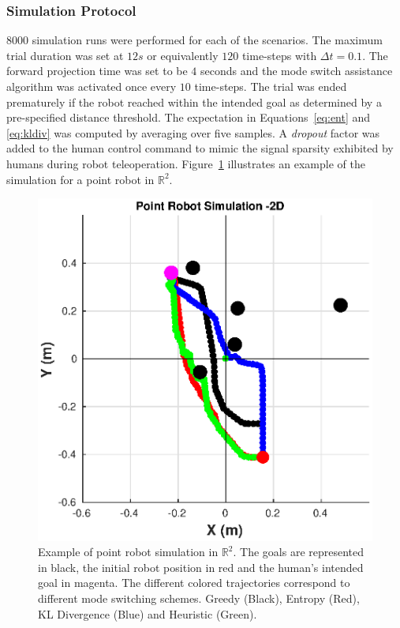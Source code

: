 \documentclass[letterpaper, 10 pt, conference]{ieeeconf}  %
\begin{document}
\subsubsection{Simulation Protocol}
8000 simulation runs were performed for each of the scenarios. 
The maximum trial duration was set at $12s$ or equivalently $120$ time-steps with $\Delta t = 0.1$. The forward projection time was set to be $4$ seconds and the mode switch assistance algorithm was activated once every $10$ time-steps. The trial was ended prematurely if the robot reached within the intended goal as determined by a pre-specified distance threshold. The expectation in Equations~\ref{eq:ent} and \ref{eq:kldiv} was computed by averaging over five samples.  A \textit{dropout} factor was added to the human control command to mimic the signal sparsity exhibited by humans during robot teleoperation. 
Figure~\ref{fig:ws_sim} illustrates an example of the simulation for a point robot in $\mathbb{R}^2$.
 \begin{figure}[h!]
	\centering
	\includegraphics[width= \hsize, height=0.25\vsize]{./figures/WS_SIM.eps}
	\vspace{-0.35cm}
	\caption{Example of point robot simulation in $\mathbb{R}^2$. The goals are represented in black, the initial robot position in red and the human's intended goal in magenta. The different colored trajectories correspond to different mode switching schemes. Greedy (Black), Entropy (Red), KL Divergence (Blue) and Heuristic (Green).} 
	\label{fig:ws_sim}
\end{figure}
\end{document}
